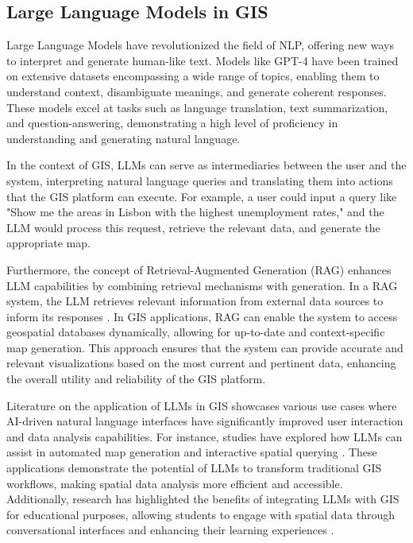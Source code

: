 \subsection{Large Language Models in GIS}

Large Language Models have revolutionized the field of NLP, offering new ways to interpret and generate human-like text. Models like GPT-4 have been trained on extensive datasets encompassing a wide range of topics, enabling them to understand context, disambiguate meanings, and generate coherent responses. These models excel at tasks such as language translation, text summarization, and question-answering, demonstrating a high level of proficiency in understanding and generating natural language.

In the context of GIS, LLMs can serve as intermediaries between the user and the system, interpreting natural language queries and translating them into actions that the GIS platform can execute. For example, a user could input a query like "Show me the areas in Lisbon with the highest unemployment rates," and the LLM would process this request, retrieve the relevant data, and generate the appropriate map. 

Furthermore, the concept of Retrieval-Augmented Generation (RAG) enhances LLM capabilities by combining retrieval mechanisms with generation. In a RAG system, the LLM retrieves relevant information from external data sources to inform its responses \cite{fan_survey_2024}. In GIS applications, RAG can enable the system to access geospatial databases dynamically, allowing for up-to-date and context-specific map generation. This approach ensures that the system can provide accurate and relevant visualizations based on the most current and pertinent data, enhancing the overall utility and reliability of the GIS platform.

Literature on the application of LLMs in GIS showcases various use cases where AI-driven natural language interfaces have significantly improved user interaction and data analysis capabilities. For instance, studies have explored how LLMs can assist in automated map generation and interactive spatial querying \cite{wang_gpt_2024}. These applications demonstrate the potential of LLMs to transform traditional GIS workflows, making spatial data analysis more efficient and accessible. Additionally, research has highlighted the benefits of integrating LLMs with GIS for educational purposes, allowing students to engage with spatial data through conversational interfaces and enhancing their learning experiences \cite{Mooney202385, Redican2024}.

